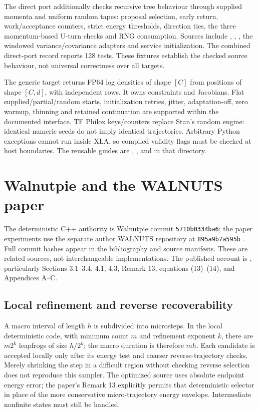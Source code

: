 The direct port additionally checks recursive tree behaviour through
supplied momenta and uniform random tapes: proposal selection, early return,
work/acceptance counters, strict energy thresholds, direction ties, the
three momentum-based U-turn checks and RNG consumption. Sources include
,
, ,
the windowed variance/covariance adapters and service initialization.
The combined direct-port record reports 128 tests. These fixtures establish
the checked source behaviour, not universal correctness over all targets.

The generic target returns FP64 log densities of shape $[C]$ from positions
of shape $[C,d]$, with independent rows. It owns constraints and Jacobians.
Flat supplied/partial/random starts, initialization retries, jitter,
adaptation-off, zero warmup, thinning and retained continuation are supported
within the documented interface. TF Philox keys/counters replace Stan's
random engine: identical numeric seeds do not imply identical trajectories.
Arbitrary Python exceptions cannot run inside XLA, so compiled validity
flags must be checked at host boundaries. The reusable guides are
, ,
 and  in that directory.

\section{Walnutpie and the WALNUTS paper}
\label{sec:sw-walnuts}

The deterministic C++ authority is Walnutpie commit
\texttt{5710b0334ba6}; the paper experiments
use the separate author WALNUTS repository at
\texttt{895a9b7a595b}
\citep{swWalnutpieSource,swWalnutsAuthor}. Full commit hashes appear in the bibliography and source manifests.
These are related sources, not interchangeable implementations. The published account is
\citet{swWalnuts2026}, particularly Sections 3.1--3.4, 4.1, 4.3,
Remark 13, equations (13)--(14), and Appendices A--C.

\subsection{Local refinement and reverse recoverability}

A macro interval of length $h$ is subdivided into microsteps. In the local
deterministic code, with minimum count $m$ and refinement exponent $k$,
there are $m2^k$ leapfrogs of size $h/2^k$; the macro duration is therefore
$mh$. Each candidate is accepted locally only after its energy test and
coarser reverse-trajectory checks. Merely shrinking the step in a difficult
region without checking reverse selection does not reproduce this sampler.
The optimized source uses absolute endpoint energy error; the paper's
Remark 13 explicitly permits that deterministic selector in place of the
more conservative micro-trajectory energy envelope. Intermediate nonfinite
states must still be handled.

